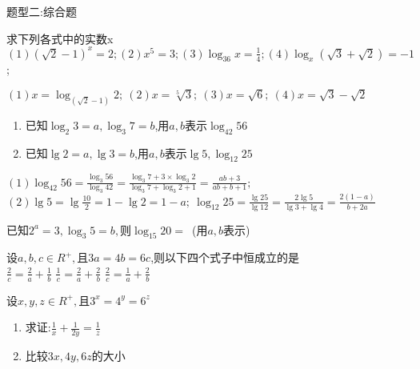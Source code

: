 \begin{tcolorbox}
    \centering
    题型二:综合题
\end{tcolorbox}

\begin{problem}
    求下列各式中的实数x\\
    $\displaystyle (1)(\sqrt{2}-1)^x=2;
    (2)x^5=3;
    (3)\log_{36}x=\frac{1}{4};
    (4)\log_x{(\sqrt{3}+\sqrt{2})}=-1$;
    \begin{jiexi}
        $(1)x=\log_{(\sqrt{2}-1)}2; \ (2)x=\sqrt[5]{3}; \ (3)x=\sqrt{6}; \ (4)x=\sqrt{3}-\sqrt{2}$
    \end{jiexi}
\end{problem}

\begin{problem}
    \begin{enumerate}
        \item 已知$\log_2{3}=a,\log_3{7}=b$,用$a,b$表示$\log_{42}{56}$
        \item 已知$\lg2=a,\lg3=b$,用$a,b$表示$\lg5,\log_{12}{25}$
    \end{enumerate}
    \begin{jiexi}
        $\displaystyle (1)\log_{42}{56}=\frac{\log_3{56}}{\log_3{42}}=\frac{\log_3{7}+3\times\log_3{2}}{\log_3{7}+\log_3{2}+1}=\frac{ab+3}{ab+b+1};$\\
        $\displaystyle (2)\lg{5}=\lg{\frac{10}{2}}=1-\lg2=1-a;\ \log_{12}{25}=\frac{\lg{25}}{\lg{12}}=\frac{2\lg{5}}{\lg3+\lg4}=\frac{2(1-a)}{b+2a}$
    \end{jiexi}
\end{problem}

\begin{problem}
    已知$2^a=3,\log_3{5}=b,\text{则}\log_{15}{20}=$\ (用$a,b$表示)
\end{problem}

\begin{problem}
    设$a,b,c\in R^+,$且$3a=4b=6c$,则以下四个式子中恒成立的是\\
    {$\displaystyle \frac{2}{c}=\frac{2}{a}+\frac{1}{b}$}
    {$\displaystyle \frac{1}{c}=\frac{2}{a}+\frac{2}{b}$}
    {$\displaystyle \frac{2}{c}=\frac{1}{a}+\frac{2}{b}$}
\end{problem}

\begin{problem}
    设$x,y,z\in R^+,$且$3^x=4^y=6^z$
    \begin{enumerate}
        \item 求证:$\displaystyle \frac{1}{x}+\frac{1}{2y}=\frac{1}{z}$
        \item 比较$3x,4y,6z$的大小
    \end{enumerate}
\end{problem}

